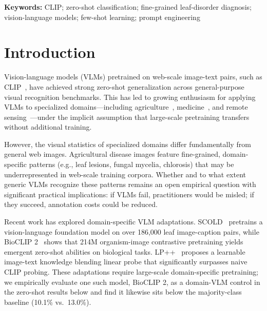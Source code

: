 \documentclass[10pt,a4paper]{article}
\begin{document}
\noindent\textbf{Keywords:} CLIP; zero-shot classification; fine-grained leaf-disorder diagnosis; vision-language models; few-shot learning; prompt engineering



\section{Introduction}
\label{sec:intro}

Vision-language models (VLMs) pretrained on web-scale image-text pairs, such as CLIP~\cite{radford2021learning}, have achieved strong zero-shot generalization across general-purpose visual recognition benchmarks.
This has led to growing enthusiasm for applying VLMs to specialized domains---including agriculture~\cite{pdclip2026}, medicine~\cite{huang2021gloria}, and remote sensing~\cite{liu2024remoteclip}---under the implicit assumption that large-scale pretraining transfers without additional training.

However, the visual statistics of specialized domains differ fundamentally from general web images.
Agricultural disease images feature fine-grained, domain-specific patterns (e.g., leaf lesions, fungal mycelia, chlorosis) that may be underrepresented in web-scale training corpora.
Whether and to what extent generic VLMs recognize these patterns remains an open empirical question with significant practical implications: if VLMs fail, practitioners would be misled; if they succeed, annotation costs could be reduced.

Recent work has explored domain-specific VLM adaptations. SCOLD~\cite{scold2025} pretrains a vision-language foundation model on over 186,000 leaf image-caption pairs, while BioCLIP 2~\cite{bioclip2} shows that 214M organism-image contrastive pretraining yields emergent zero-shot abilities on biological tasks. LP++~\cite{lpplus} proposes a learnable image-text knowledge blending linear probe that significantly surpasses naive CLIP probing. These adaptations require large-scale domain-specific pretraining; we empirically evaluate one such model, BioCLIP 2, as a domain-VLM control in the zero-shot results below and find it likewise sits below the majority-class baseline (10.1\% vs.\ 13.0\%).
\end{document}
